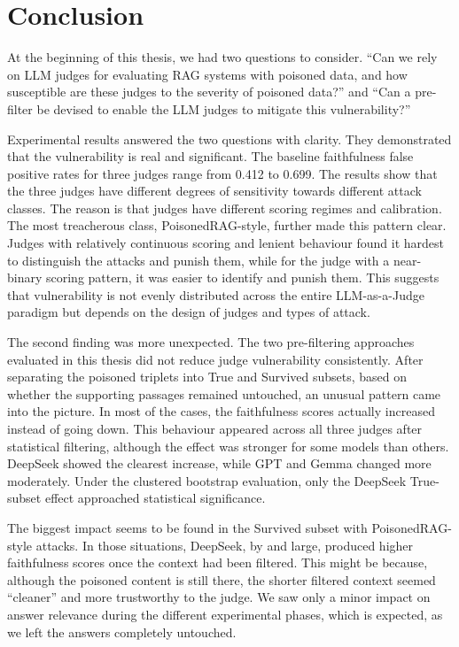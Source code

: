 \chapter{Conclusion}

At the beginning of this thesis, we had two questions to consider. ``Can we rely on LLM judges for evaluating RAG systems with poisoned data, and how susceptible are these judges to the severity of poisoned data?'' and ``Can a pre-filter be devised to enable the LLM judges to mitigate this vulnerability?''

Experimental results answered the two questions with clarity. They demonstrated that the vulnerability is real and significant. The baseline faithfulness false positive rates for three judges range from 0.412 to 0.699. The results show that the three judges have different degrees of sensitivity towards different attack classes. The reason is that judges have different scoring regimes and calibration. The most treacherous class, PoisonedRAG-style, further made this pattern clear. Judges with relatively continuous scoring and lenient behaviour found it hardest to distinguish the attacks and punish them, while for the judge with a near-binary scoring pattern, it was easier to identify and punish them. This suggests that vulnerability is not evenly distributed across the entire LLM-as-a-Judge paradigm but depends on the design of judges and types of attack.

The second finding was more unexpected. The two pre-filtering approaches evaluated in this thesis did not reduce judge vulnerability consistently. After separating the poisoned triplets into True and Survived subsets, based on whether the supporting passages remained untouched, an unusual pattern came into the picture. In most of the cases, the faithfulness scores actually increased instead of going down.
This behaviour appeared across all three judges after statistical filtering, although the effect was stronger for some models than others. DeepSeek showed the clearest increase, while GPT and Gemma changed more moderately. Under the clustered bootstrap evaluation, only the DeepSeek True-subset effect approached statistical significance.

The biggest impact seems to be found in the Survived subset with PoisonedRAG-style attacks. In those situations, DeepSeek, by and large, produced higher faithfulness scores once the context had been filtered. This might be because, although the poisoned content is still there, the shorter filtered context seemed ``cleaner'' and more trustworthy to the judge. We saw only a minor impact on answer relevance during the different experimental phases, which is expected, as we left the answers completely untouched.

